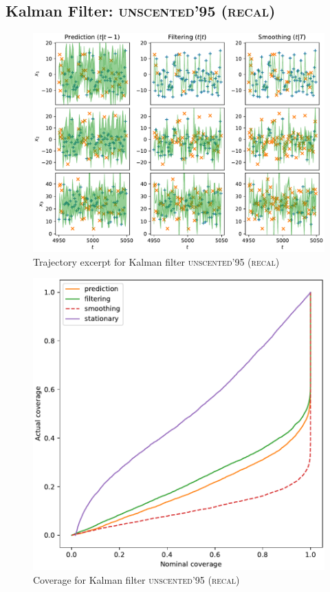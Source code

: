 \subsection{Kalman Filter: {\textsc{unscented'95 (recal)}}}
\begin{figure}[H]
\begin{center}
\includegraphics[width=\linewidth]{generated/trajectory/Method.UNSCENTED0-Recalibrate.YES.pdf}
\end{center}
\caption{Trajectory excerpt for Kalman filter \textsc{{\textsc{unscented'95 (recal)}}}}
\end{figure}
\begin{figure}[H]
\begin{center}
\includegraphics[width=\linewidth]{generated/coverage/Method.UNSCENTED0-Recalibrate.YES.pdf}
\end{center}
\caption{Coverage for Kalman filter \textsc{{\textsc{unscented'95 (recal)}}}}
\end{figure}
